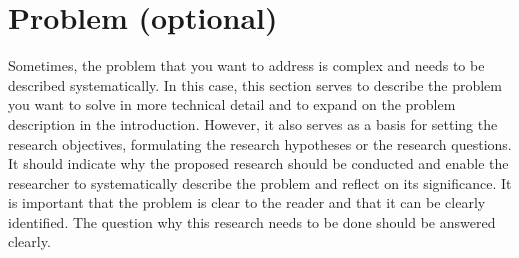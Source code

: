 \section*{Problem (optional)}

Sometimes, the problem that you want to address is complex and needs to be described systematically. In this case, this section serves to describe the problem you want to solve in more technical detail and to expand on the problem description in the introduction. However, it also serves as a basis for setting the research objectives, formulating the research hypotheses or the research questions.\\

\noindent It should indicate why the proposed research should be conducted and enable the researcher to systematically describe the problem and reflect on its significance. It is important that the problem is clear to the reader and that it can be clearly identified. The question why this research needs to be done should be answered clearly.
